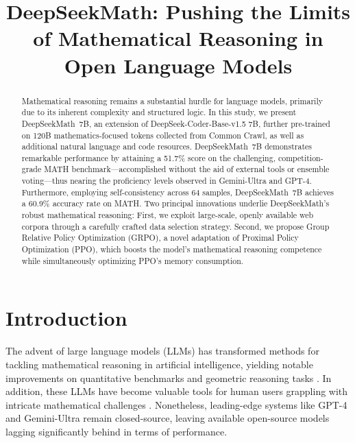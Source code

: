 \title{DeepSeekMath: Pushing the Limits of Mathematical Reasoning in Open Language Models}

\begin{abstract}
Mathematical reasoning remains a substantial hurdle for language models, primarily due to its inherent complexity and structured logic. In this study, we present DeepSeekMath~7B, an extension of DeepSeek-Coder-Base-v1.5 7B, further pre-trained on 120B mathematics-focused tokens collected from Common Crawl, as well as additional natural language and code resources. DeepSeekMath~7B demonstrates remarkable performance by attaining a 51.7\% score on the challenging, competition-grade MATH benchmark—accomplished without the aid of external tools or ensemble voting—thus nearing the proficiency levels observed in Gemini-Ultra and GPT-4. Furthermore, employing self-consistency across 64 samples, DeepSeekMath~7B achieves a 60.9\% accuracy rate on MATH. Two principal innovations underlie DeepSeekMath’s robust mathematical reasoning: First, we exploit large-scale, openly available web corpora through a carefully crafted data selection strategy. Second, we propose Group Relative Policy Optimization (GRPO), a novel adaptation of Proximal Policy Optimization (PPO), which boosts the model’s mathematical reasoning competence while simultaneously optimizing PPO’s memory consumption.
\end{abstract}

\section{Introduction}

The advent of large language models (LLMs) has transformed methods for tackling mathematical reasoning in artificial intelligence, yielding notable improvements on quantitative benchmarks \citep{MATH} and geometric reasoning tasks \citep{trinh2024solving}. In addition, these LLMs have become valuable tools for human users grappling with intricate mathematical challenges \citep{tao}. Nonetheless, leading-edge systems like GPT-4 \citep{gpt4} and Gemini-Ultra \citep{gemini} remain closed-source, leaving available open-source models lagging significantly behind in terms of performance.

